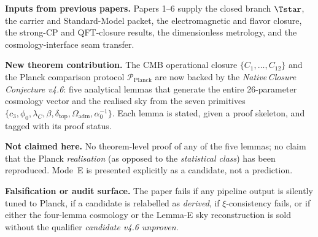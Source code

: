 \begin{tfptfrontbox}
\textbf{Inputs from previous papers.} Papers 1--6 supply the closed
branch \(\Tstar\), the carrier and Standard-Model packet, the
electromagnetic and flavor closure, the strong-CP and QFT-closure
results, the dimensionless metrology, and the cosmology-interface seam
transfer.

\textbf{New theorem contribution.} The CMB operational closure
\(\{C_1,\dots,C_{12}\}\) and the Planck comparison protocol
\(\mathcal P_{\mathrm{Planck}}\) are now backed by the
\emph{Native\,Closure\,Conjecture v4.6}: five analytical lemmas that
generate the entire 26-parameter cosmology vector and the realised
sky from the seven primitives
\(\{c_3,\phi_0,\lambda_C,\beta,\delta_{\mathrm{top}},
\Omega_{\mathrm{adm}},\alpha_0^{-1}\}\).  Each lemma is stated, given a
proof skeleton, and tagged with its proof status.

\textbf{Not claimed here.} No theorem-level proof of any of the five
lemmas; no claim that the Planck \emph{realisation} (as opposed to the
\emph{statistical class}) has been reproduced.  Mode~E is presented
explicitly as a candidate, not a prediction.

\textbf{Falsification or audit surface.} The paper fails if any
pipeline output is silently tuned to Planck, if a candidate is
relabelled as \emph{derived}, if \(\xi\)-consistency fails, or if
either the four-lemma cosmology or the Lemma-E sky reconstruction is
sold without the qualifier \emph{candidate v4.6 unproven}.
\end{tfptfrontbox}


